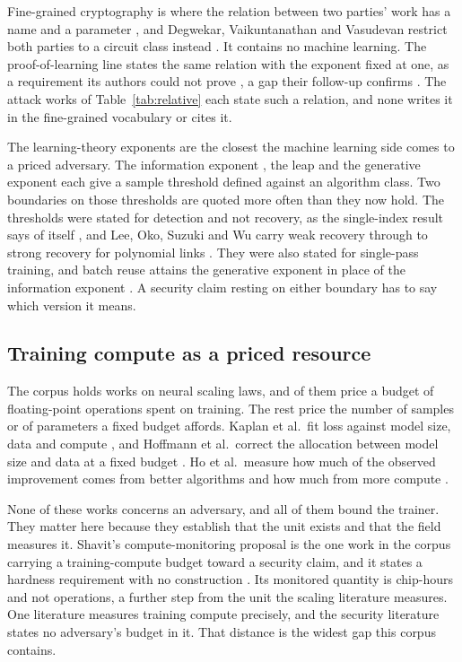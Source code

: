 Fine-grained cryptography is where the relation between two parties' work has
a name and a parameter \cite{BC22,LLW19,BRSV17}, and Degwekar, Vaikuntanathan
and Vasudevan restrict both parties to a circuit class instead \cite{DVV16}.
It contains no machine learning. The proof-of-learning line states the same
relation with the exponent fixed at one, as a requirement its authors could
not prove \cite{JYCDTCP21}, a gap their follow-up confirms \cite{FJTYCDCP23}.
The
\NumRelativeAttack{} attack works of Table~\ref{tab:relative} each state such a
relation, and none writes it in the fine-grained vocabulary or cites it.

The learning-theory exponents are the closest the machine learning side comes
to a priced adversary. The information exponent \cite{AGJ21}, the leap
\cite{ABM23} and the generative exponent \cite{DPLB24,DLB25} each give a sample
threshold defined against an algorithm class. Two boundaries on those
thresholds are quoted more often than they now hold. The thresholds were
stated for detection and not recovery, as the single-index result says of
itself
\cite{DPLB24}, and Lee, Oko, Suzuki and Wu carry weak recovery through to strong
recovery for polynomial links \cite{LOSW24,Gla24}. They were also stated for
single-pass training, and batch reuse attains the generative exponent in place
of the information exponent \cite{DTAPZK24,TME25,KJWSM26}. A security claim
resting on either boundary has to say which version it means.

\subsection{Training compute as a priced resource}

The corpus holds \NumScaling{} works on neural scaling laws, and \NumFlops{}
of them price a budget of floating-point operations spent on training. The
rest price the number of samples or of parameters a fixed budget affords.
Kaplan et al.\ fit loss against model size, data and compute
\cite{KMHBCCGRWA20}, and Hoffmann et al.\ correct the allocation between model
size and data at a fixed budget
\cite{HBMBCRCHWCHNMDDGOSERVS22}. Ho et al.\ measure how much of the observed
improvement comes from better algorithms and how much from more compute
\cite{HBEORGATS24}.

None of these works concerns an adversary, and all of them bound the trainer.
They matter here because they establish that the unit exists and that the
field measures it. Shavit's compute-monitoring proposal is the one work in the
corpus carrying a training-compute budget toward a security claim, and it
states a hardness requirement with no construction \cite{Sha23}. Its monitored
quantity is chip-hours and not operations, a further step from the unit the
scaling literature measures. One literature measures training compute
precisely, and the security literature states no adversary's budget in it.
That distance is the widest gap this corpus contains.

